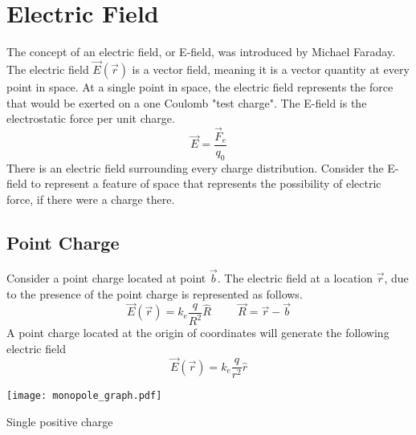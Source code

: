 


\section {Electric Field}
The concept of an electric field, or E-field, was introduced by Michael Faraday.  The electric field $\overrightarrow{E}(\overrightarrow{r})$ is a vector field, meaning it is a vector quantity at every point in space.  At a single point in space, the electric field represents the force that would be exerted on a one Coulomb "test charge".  The E-field is the electrostatic force per unit charge.
$$\overrightarrow{E}=\frac{\overrightarrow{F}_e}{q_0}$$
There is an electric field surrounding every charge distribution.  Consider the E-field to represent a feature of space that represents the possibility of electric force, if there were a charge there.
\subsection{Point Charge}
Consider a point charge located at point $\overrightarrow{b}$.  The electric field at a location $\overrightarrow{r}$, due to the presence of the  point charge is represented as follows.  
$$\overrightarrow{E}(\overrightarrow{r})=k_e\frac{q}{R^2}\hat{R} \hspace{1cm} \overrightarrow{R}=\overrightarrow{r}-\overrightarrow{b}$$
A point charge located at the origin of coordinates will generate the following electric field
$$\overrightarrow{E}(\overrightarrow{r})=k_e\frac{q}{r^2} \hat{r} $$



\begin{marginfigure}[-60pt]%
  \texttt{[image: monopole\_graph.pdf]}
  \caption{Single positive charge}
  \label{fig:marginfig}
\end{marginfigure}




